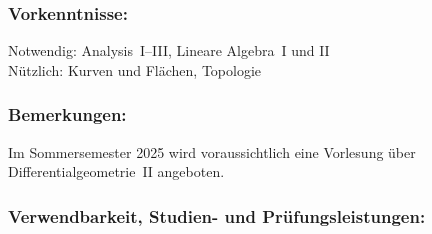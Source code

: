 \documentclass[a4paper,10pt]{article}
\begin{document}
\subsubsection*{\large
    Vorkenntnisse:
}
Notwendig: Analysis~I–III, Lineare Algebra~I und II \\
Nützlich: Kurven und Flächen, Topologie
\subsubsection*{\large
    Bemerkungen:
}
Im Sommersemester 2025 wird voraussichtlich eine Vorlesung über Differentialgeometrie~II angeboten. 
\cleardoublepage
\subsubsection*{\large
    Verwendbarkeit, Studien- und Prüfungsleistungen:
}
\end{document}
